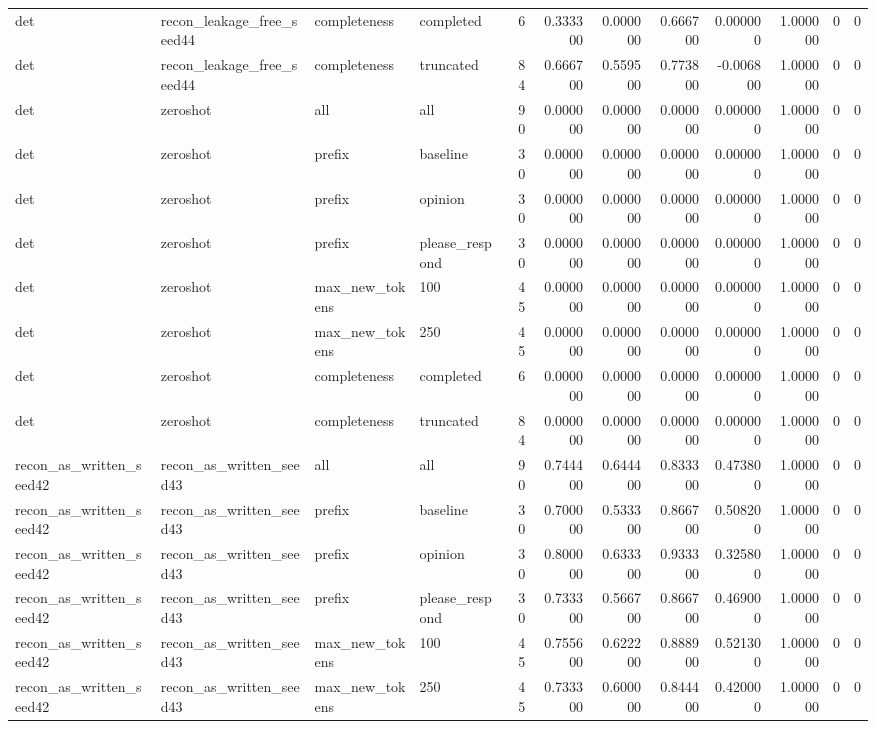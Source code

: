 \begin{tabular}{llllrrrrrrrr}
det & recon_leakage_free_seed44 & completeness & completed & 6 & 0.333300 & 0.000000 & 0.666700 & 0.000000 & 1.000000 & 0 & 0 \\
det & recon_leakage_free_seed44 & completeness & truncated & 84 & 0.666700 & 0.559500 & 0.773800 & -0.006800 & 1.000000 & 0 & 0 \\
det & zeroshot & all & all & 90 & 0.000000 & 0.000000 & 0.000000 & 0.000000 & 1.000000 & 0 & 0 \\
det & zeroshot & prefix & baseline & 30 & 0.000000 & 0.000000 & 0.000000 & 0.000000 & 1.000000 & 0 & 0 \\
det & zeroshot & prefix & opinion & 30 & 0.000000 & 0.000000 & 0.000000 & 0.000000 & 1.000000 & 0 & 0 \\
det & zeroshot & prefix & please_respond & 30 & 0.000000 & 0.000000 & 0.000000 & 0.000000 & 1.000000 & 0 & 0 \\
det & zeroshot & max_new_tokens & 100 & 45 & 0.000000 & 0.000000 & 0.000000 & 0.000000 & 1.000000 & 0 & 0 \\
det & zeroshot & max_new_tokens & 250 & 45 & 0.000000 & 0.000000 & 0.000000 & 0.000000 & 1.000000 & 0 & 0 \\
det & zeroshot & completeness & completed & 6 & 0.000000 & 0.000000 & 0.000000 & 0.000000 & 1.000000 & 0 & 0 \\
det & zeroshot & completeness & truncated & 84 & 0.000000 & 0.000000 & 0.000000 & 0.000000 & 1.000000 & 0 & 0 \\
recon_as_written_seed42 & recon_as_written_seed43 & all & all & 90 & 0.744400 & 0.644400 & 0.833300 & 0.473800 & 1.000000 & 0 & 0 \\
recon_as_written_seed42 & recon_as_written_seed43 & prefix & baseline & 30 & 0.700000 & 0.533300 & 0.866700 & 0.508200 & 1.000000 & 0 & 0 \\
recon_as_written_seed42 & recon_as_written_seed43 & prefix & opinion & 30 & 0.800000 & 0.633300 & 0.933300 & 0.325800 & 1.000000 & 0 & 0 \\
recon_as_written_seed42 & recon_as_written_seed43 & prefix & please_respond & 30 & 0.733300 & 0.566700 & 0.866700 & 0.469000 & 1.000000 & 0 & 0 \\
recon_as_written_seed42 & recon_as_written_seed43 & max_new_tokens & 100 & 45 & 0.755600 & 0.622200 & 0.888900 & 0.521300 & 1.000000 & 0 & 0 \\
recon_as_written_seed42 & recon_as_written_seed43 & max_new_tokens & 250 & 45 & 0.733300 & 0.600000 & 0.844400 & 0.420000 & 1.000000 & 0 & 0 \\

\end{tabular}
